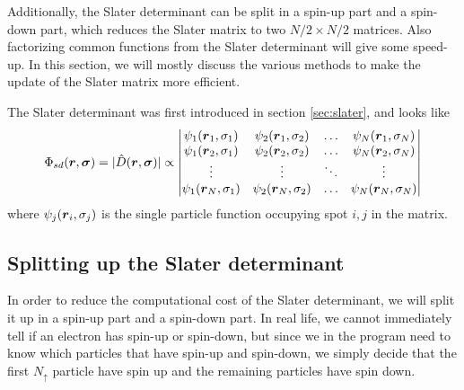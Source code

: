 Additionally, the Slater determinant can be split in a spin-up part and a spin-down part, which reduces the Slater matrix to two $N/2\times N/2$ matrices. Also factorizing common functions from the Slater determinant will give some speed-up. In this section, we will mostly discuss the various methods to make the update of the Slater matrix more efficient. 

The Slater determinant was first introduced in section \ref{sec:slater}, and looks like
\begin{equation}
\Phi_{sd}(\boldsymbol{{r}},\boldsymbol{{\sigma}})=|\hat{D}(\boldsymbol{{r}},\boldsymbol{{\sigma}})|\propto
\begin{vmatrix}
\psi_1(\boldsymbol{r}_1,\sigma_1) & \psi_2(\boldsymbol{r}_1,\sigma_2) & \hdots & \psi_N(\boldsymbol{r}_1,\sigma_N)\\
\psi_1(\boldsymbol{r}_2,\sigma_1) & \psi_2(\boldsymbol{r}_2,\sigma_2) & \hdots & \psi_N(\boldsymbol{r}_2,\sigma_N)\\
\vdots & \vdots & \ddots & \vdots \\
\psi_1(\boldsymbol{r}_N,\sigma_1) & \psi_2(\boldsymbol{r}_N,\sigma_2) & \hdots & \psi_N(\boldsymbol{r}_N,\sigma_N)
\end{vmatrix}
\label{eq:generalslater}
\end{equation}
where $\psi_j(\boldsymbol{{r}}_i,\sigma_j)$ is the single particle function occupying spot $i,j$ in the matrix.

\subsection{Splitting up the Slater determinant} \label{sec:splittingofslater}
In order to reduce the computational cost of the Slater determinant, we will split it up in a spin-up part and a spin-down part. In real life, we cannot immediately tell if an electron has spin-up or spin-down, but since we in the program need to know which particles that have spin-up and spin-down, we simply decide that the first $N_{\uparrow}$ particle have spin up and the remaining particles have spin down. 

